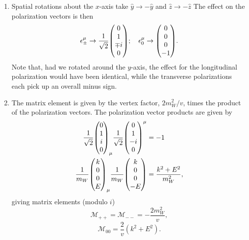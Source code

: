 \documentclass[12pt]{article}
\begin{document}
\begin{enumerate}[label=(\alph*)]
    \item Spatial rotations about the $x$-axis take $\hat{y}\to-\hat{y}$ and $\hat{z}\to-\hat{z}$ The effect on the polarization vectors is then
    \[ \epsilon_\pm^\mu \to \frac{1}{\sqrt{2}}\mqty(0\\1\\\mp i\\0); \quad \epsilon_0^\mu \to \mqty(0\\0\\0\\-1). \]
    Note that, had we rotated around the $y$-axis, the effect for the longitudinal polarization would have been identical, while the transverse polarizations each pick up an overall minus sign.

    \item The matrix element is given by the vertex factor, $2m_W^2/v$, times the product of the polarization vectors. The polarization vector products are given by
    \begin{align*}
        \frac{1}{\sqrt{2}}\mqty(0\\1\\i\\0)_\mu \frac{1}{\sqrt{2}}\mqty(0\\1\\-i\\0)^\mu &= -1 \\
        \frac{1}{m_W}\mqty(k\\0\\0\\E)_\mu\frac{1}{m_W}\mqty(k\\0\\0\\-E) &= \frac{k^2 + E^2}{m_W^2},
    \end{align*}
    giving matrix elements (modulo $i$)
    \[ \mathcal{M}_{++} = \mathcal{M}_{--} = -\frac{2m_W^2}{v}, \]
    \[ \mathcal{M}_{00} = \frac{2}{v}(k^2 + E^2). \]


\end{enumerate}
\end{document}
